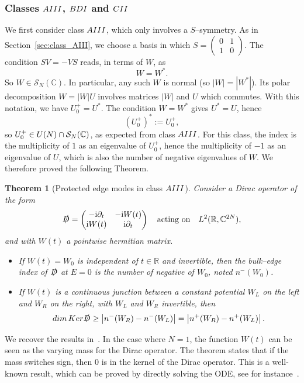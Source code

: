 \documentclass[11pt]{amsart}
\numberwithin{equation}{section} %
\newtheorem{theorem}{Theorem}[section]
\newcommand\1{{\mathds 1}}
\def\C{{\mathbb C}}
\def\R{{\mathbb R}}
\def\ri{{\mathrm{i}}}
\def\cS{{\mathcal S}}
\def\rAIII{{\rm AIII}}
\def\rBDI{{\rm BDI}}
\def\rCII{{\rm CII}}
\def\U{{\rm U}}
\def\Ker{{\rm Ker }}
\def\dim{{\rm dim }}
\def\Dirac{\slashed{D}} %
\begin{document}
\subsubsection{Classes $\rAIII$, $\rBDI$ and $\rCII$}
We first consider class $\rAIII$, which only involves a $S$--symmetry. As in Section~\ref{sec:class_AIII}, we choose a basis in which $S = \begin{pmatrix} 0 & 1 \\ 1 & 0 \end{pmatrix}$. The condition $SV = - VS$ reads, in terms of $W$, as
\[
    W = W^*.
\]
So $W \in \cS_N(\C)$. In particular, any such $W$ is normal (so $| W | = | W^* |$). Its polar decomposition $W = | W | U$ involves matrices $| W |$ and $U$ which commutes. With this notation, we have $U_0^+ = U^*$. The condition $W = W^*$ gives $U^* = U$, hence
\[
    \left( U_0^+ \right)^* := U_0^+,
\]
so $U_0^+ \in \U(N) \cap \cS_N(\C)$, as expected from class $\rAIII$. For this class, the index is the multiplicity of $1$ as an eigenvalue of $U_0^+$, hence the multiplicity of $-1$ as an eigenvalue of $U$, which is also the number of negative eigenvalues of $W$. We therefore proved the following Theorem.

\begin{theorem}[Protected edge modes in class $\rAIII$]
    Consider a Dirac operator of the form
    \[
    \Dirac = \begin{pmatrix}
        - \ri \partial_t & - \ri W(t) \\ \ri W(t) & \ri \partial_t
    \end{pmatrix} \quad \text{acting on} \quad L^2(\R, \C^{2N}),
    \]
    and with $W(t)$ a pointwise hermitian matrix. 
    \begin{itemize}
        \item If $W(t) = W_0$ is independent of $t \in \R$ and invertible, then the bulk--edge index of $\Dirac$ at $E = 0$ is the number of negative of $W_0$, noted $n^-(W_0)$.
        \item If $W(t)$ is a continuous junction between a constant potential $W_L$ on the left and $W_R$ on the right, with $W_L$ and $W_R$ invertible, then
        \[
        \dim \, \Ker \Dirac \ge \left| n^-(W_R) - n^-(W_L) \right| =  \left| n^+(W_R) - n^+(W_L) \right|.
        \]
    \end{itemize}
\end{theorem}
We recover the results in~\cite{Gom-}. In the case where $N = 1$, the function $W(t)$ can be seen as the varying mass for the Dirac operator. The theorem states that if the mass switches sign, then $0$ is in the kernel of the Dirac operator. This is a well-known result, which can be proved by directly solving the ODE, see for instance~\cite{FefLeeWei-17}. 
\end{document}
